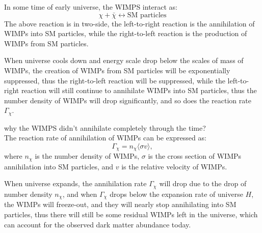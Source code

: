 \clearpage
\begin{theory}
    In some time of early universe, the WIMPS interact as:
    \[
        \chi + \bar{\chi} \leftrightarrow \text{SM particles}
    \]
    The above reaction is in two-side, the left-to-right reaction is the annihilation of WIMPs into SM particles, while the right-to-left reaction is the production of WIMPs from SM particles. \\
\end{theory}
When universe cools down and energy scale drop below the scales of mass of WIMPs, the creation of WIMPs from SM particles will be exponentially suppressed, thus the right-to-left reaction will be suppressed, while the left-to-right reaction will still continue to annihilate WIMPs into SM particles, thus the number density of WIMPs will drop significantly, and so does the reaction rate $\Gamma_\chi$. \\

\bigskip\noindent
\begin{extra}
    why the WIMPS didn't annihilate completely through the time? \\
    
    The reaction rate of annihilation of WIMPs can be expressed as:
    \[
        \Gamma_\chi = n_\chi \langle \sigma v \rangle,
    \]
    where $n_\chi$ is the number density of WIMPs, $\sigma$ is the cross section of WIMPs annihilation into SM particles, and $v$ is the relative velocity of WIMPs.

    When universe expands, the annihilation rate $\Gamma_\chi$ will drop due to the drop of number density $n_\chi$, and when $\Gamma_\chi$ drops below the expansion rate of universe $H$, the WIMPs will freeze-out, and they will nearly stop annihilating into SM particles, thus there will still be some residual WIMPs left in the universe, which can account for the observed dark matter abundance today.
\end{extra}